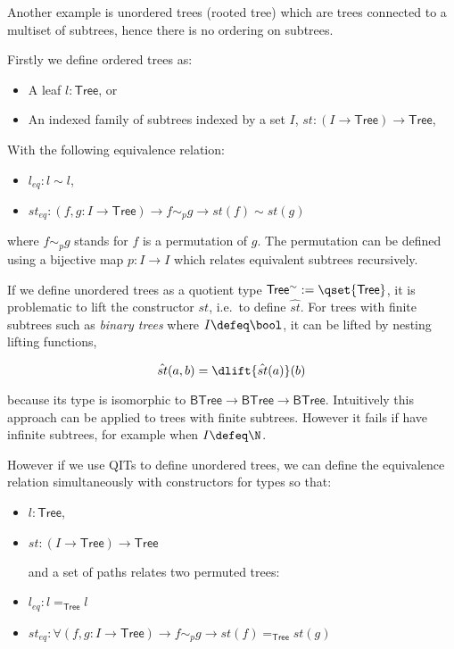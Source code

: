 Another example is unordered trees (rooted tree) which are trees connected to a multiset of subtrees, hence there is no ordering on subtrees.

Firstly we define ordered trees as:

\begin{itemize}
\item A leaf $l: \mathsf{Tree}$, or
\item An indexed family of subtrees indexed by a set $I$, $st : (I \rightarrow \mathsf{Tree}) \rightarrow \mathsf{Tree}$,
\end{itemize}

With the following equivalence relation:

\begin{itemize}
\item $l_{eq} : l \sim l$,
\item $st_{eq} : (f , g : I \to \mathsf{Tree}) \to f \sim_{p} g \to st(f) \sim st(g)$
\end{itemize}

where $f \sim_{p} g$ stands for $f$ is a permutation of $g$. The permutation can be defined using a bijective map $p : I \to I$ which relates equivalent subtrees recursively.


If we define unordered trees as a quotient type $\mathsf{Tree^{\sim}} := \qset{\mathsf{Tree}}$, 
it is problematic to lift the constructor $st$, i.e.\ to define $\hat{st}$.
For trees with finite subtrees such as \emph{binary trees} where $I \defeq \bool$, it can be lifted by nesting lifting functions,

$$\hat{st}(a,b) = \dlift{\hat{st}(a)}(b)$$

because its type is isomorphic to $\mathsf{BTree} \rightarrow \mathsf{BTree} \rightarrow \mathsf{BTree}$.
Intuitively this approach can be applied to trees with finite subtrees. However it fails if have infinite subtrees, for example when $I \defeq \N$.

However if we use QITs to define unordered trees, we can define the equivalence relation simultaneously with constructors for types so that:

\begin{itemize}
\item $l: \mathsf{Tree}$, 
\item $st : (I \rightarrow \mathsf{Tree}) \rightarrow \mathsf{Tree}$

and a set of paths relates two permuted trees:

\item $l_{eq} : l  =_{\mathsf{Tree}} l $

\item$st_{eq} : \forall (f, g : I \to \mathsf{Tree}) \rightarrow  f \sim_{p} g \rightarrow  st(f) =_{\mathsf{Tree}} st(g)$
\end{itemize}


